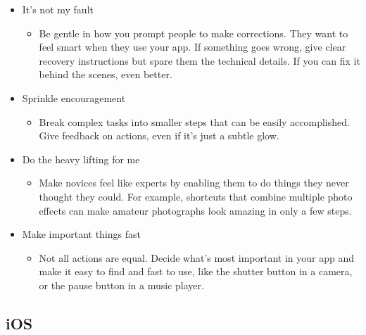 \begin{itemize}
\begin{itemize}
\begin{itemize}
\end{itemize}
\item It's not my fault
\begin{itemize}
\item Be gentle in how you prompt people to make corrections. They want to feel smart when they use your app. If something goes wrong, give clear recovery instructions but spare them the technical details. If you can fix it behind the scenes, even better.
\end{itemize}
\item Sprinkle encouragement
\begin{itemize}
\item Break complex tasks into smaller steps that can be easily accomplished. Give feedback on actions, even if it's just a subtle glow.
\end{itemize}
\item Do the heavy lifting for me
\begin{itemize}
\item Make novices feel like experts by enabling them to do things they never thought they could. For example, shortcuts that combine multiple photo effects can make amateur photographs look amazing in only a few steps.
\end{itemize}
\item Make important things fast
\begin{itemize}
\item Not all actions are equal. Decide what's most important in your app and make it easy to find and fast to use, like the shutter button in a camera, or the pause button in a music player.
\end{itemize}
\end{itemize}
\end{itemize}

\subsection*{iOS}